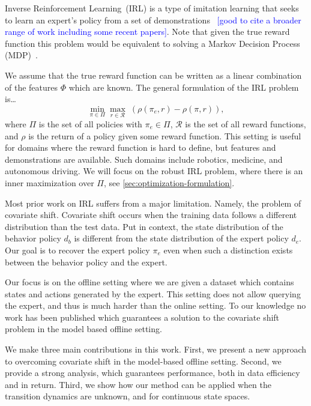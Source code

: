 \documentclass[11pt]{article}
\newcommand{\mm}[1]{\textcolor{blue}{[#1]}}
\begin{document}
Inverse Reinforcement Learning~(IRL) is a type of imitation learning that seeks to learn an expert's policy from a set of demonstrations~\cite{chang2021mitigating}
\mm{good to cite a broader range of work including some recent papers}.
Note that given the true reward function this problem would be equivalent to solving a Markov Decision Process (MDP)~\cite{Puterman1994}.

We assume that the true reward function can be written as a linear combination of the features $\Phi$ which are known.
The general formulation of the IRL problem is\dots
\begin{equation} \label{eq:IRL_formulation}
	\min_{\pi \in \Pi} \max_{r \in \mathcal{R}} \; (\rho(\pi_e, r) - \rho(\pi, r)),
\end{equation}
where $\Pi$ is the set of all policies with $\pi_e \in \Pi$, $\mathcal{R}$ is the set of all reward functions, and $\rho$ is the return of a policy given some reward function. This setting is useful for domains where the reward function is hard to define, but features and demonstrations are available. Such domains include robotics, medicine, and autonomous driving. We will focus on the robust IRL problem, where there is an inner maximization over $\Pi$, see \cref{sec:optimization-formulation}.

Most prior work on IRL suffers from a major limitation. Namely, the problem of covariate shift. Covariate shift occurs when the training data follows a different distribution than the test data. Put in context, the state distribution of the behavior policy $d_b$ is different from the state distribution of the expert policy $d_e$. Our goal is to recover the expert policy $\pi_e$ even when such a distinction exists between the behavior policy and the expert.

Our focus is on the offline setting where we are given a dataset which contains states and actions generated by the expert. This setting does not allow querying the expert, and thus is much harder than the online setting. To our knowledge no work has been published which guarantees a solution to the covariate shift problem in the model based offline setting.

We make three main contributions in this work. First, we present a new approach to overcoming covariate shift in the model-based offline setting. Second, we provide a strong analysis, which guarantees performance, both in data efficiency and in return. Third, we show how our method can be applied when the transition dynamics are unknown, and for continuous state spaces.
\end{document}
